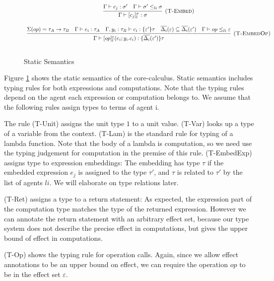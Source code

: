 \begin{figure}[t]
{\[\begin{array}{c}
\infer[\textsc{(T-Embed)}]
  {\Gamma\vdash [c_j]^\sigma_l : \sigma }
  {\Gamma \vdash c_j : \sigma' & \Gamma \vdash \sigma' \leq_{li} \sigma  } \\[3ex]
  
\infer[\textsc{(T-EmbedOp)}]
  {\Gamma\vdash [op]^\varepsilon_l(e_i; y_i.c_i) : \{\overline{\Delta_i}(\varepsilon')\}\tau }
  {\Sigma(op) = \tau_A \rightarrow \tau_B & \Gamma \vdash e_i : \tau_A & \Gamma,y_i:\tau_B\vdash c_i: \{\varepsilon'\}\tau & \overline{\Delta_i}(\varepsilon) \subseteq \overline{\Delta_i}(\varepsilon') & \Gamma \vdash op \leq_{li} \varepsilon} \\[3ex]
  
\end{array} \\[3ex]
\]
}


\caption{Static Semantics}
\label{fig-static}
\end{figure}

Figure \ref{fig-static} shows the static semantics of the core-calculus. Static semantics includes typing rules for both expressions and computations. Note that the typing rules depend on the agent each expression or computation belongs to. We assume that the following rules assign types to terms of agent i.

The rule (T-Unit) assigns the unit type $1$ to a unit value. (T-Var) looks up a type of a variable from the context. (T-Lam) is the standard rule for typing of a lambda function. Note that the body of a lambda is computation, so we need use the typing judgement for computation in the premise of this rule. (T-EmbedExp) assigns type to expression embeddings: The embedding has type $\tau$ if the embedded expression $e_j$ is assigned to the type $\tau'$, and $\tau$ is related to $\tau'$ by the list of agents $li$. We will elaborate on type relations later. 

(T-Ret) assigns a type to a return statement: As expected, the expression part of the computation type matches the type of the returned expression. However we can annotate the return statement with an arbitrary effect set, because our type system does not describe the precise effect in computations, but gives the upper bound of effect in computations.  

(T-Op) shows the typing rule for operation calls. Again, since we allow effect annotations to be an upper bound on effect, we can require the operation $op$ to be in the effect set $\varepsilon$.

